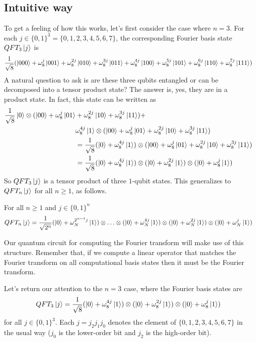 \subsection{Intuitive way}
To get a feeling of how this works, let's first consider the case where $n=3$. For each $j\in\{0,1\}^3=\{0,1,2,3,4,5,6,7\}$, the corresponding Fourier basis state $QFT_3\ket{j}$ is
\[
\frac{1}{\sqrt{8}}(\ket{000}+\omega_8^j\ket{001}+\omega_8^{2j}\ket{010}+\omega_8^{3j}\ket{011}+\omega_8^{4j}\ket{100}+\omega_8^{5j}\ket{101}+\omega_8^{6j}\ket{110}+\omega_8^{7j}\ket{111})
\]
A natural question to ask is are these three qubits entangled or can be decomposed into a tensor product state? The answer is, yes, they are in a product state. In fact, this state can be written as
\begin{align*}
\frac{1}{\sqrt{8}}\ket{0}\otimes(\ket{00}+\omega_8^j\ket{01}&+\omega_8^{2j}\ket{10}+\omega_8^{3j}\ket{11})+ \\
&\omega_8^{4j}\ket{1}\otimes(\ket{00}+\omega_8^{j}\ket{01}+\omega_8^{2j}\ket{10}+\omega_8^{3j}\ket{11})\\
&=\frac{1}{\sqrt{8}}(\ket{0}+\omega_8^{4j}\ket{1})\otimes (\ket{00}+\omega_8^j\ket{01}+\omega_8^{2j}\ket{10}+\omega_8^{3j}\ket{11})\\
&=\frac{1}{\sqrt{8}}(\ket{0}+\omega_8^{4j}\ket{1})\otimes(\ket{0}+\omega_8^{2j}\ket{1})\otimes (\ket{0}+\omega_8^j\ket{1})
\end{align*}
So $QFT_3\ket{j}$ is a tensor product of three $1$-qubit states. This generalizes to $QFT_n\ket{j}$ for all $n\geq 1$, as follows.
\begin{lemma}\label{lem:QFT}
    For all $n\geq1$ and $j\in\{0,1\}^n$
    \begin{equation}
        QFT_n\ket{j} = \frac{1}{\sqrt{2^{n}}}(\ket{0}+\omega_N^{2^{n-1}j}\ket{1})\otimes \ldots \otimes (\ket{0}+\omega_N^{4j}\ket{1})\otimes (\ket{0}+\omega_N^{2j}\ket{1})\otimes (\ket{0}+\omega_N^j\ket{1})
        \label{eq:qft_n}
    \end{equation}
\end{lemma}
Our quantum circuit for computing the Fourier transform will make use of this structure. Remember that, if we compute a linear operator that matches the Fourier transform on all computational basis states then it must be the Fourier transform.

Let's return our attention to the $n=3$ case, where the Fourier basis states are
\begin{equation}
QFT_3\ket{j}=\frac{1}{\sqrt{8}}(\ket{0}+\omega_8^{4j}\ket{1})\otimes(\ket{0}+\omega_8^{2j}\ket{1})\otimes (\ket{0}+\omega_8^j\ket{1})
\label{eq:qft_8}
\end{equation}
for all $j\in\{0,1\}^3$. Each $j=j_2j_1j_0$ denotes the element of $\{0,1,2,3,4,5,6,7\}$ in the usual way ($j_0$ is the lower-order bit and $j_2$ is the high-order bit).


